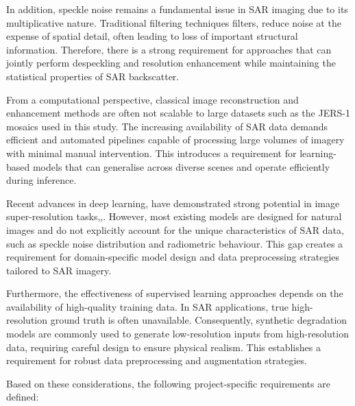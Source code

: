 \documentclass[conference]{IEEEtran}
\begin{document}
In addition, speckle noise remains a fundamental issue in SAR imaging due to its multiplicative nature. Traditional filtering techniques filters, reduce noise at the expense of spatial detail, often leading to loss of important structural information\cite{wei2025dynamical,electronics12132975}. Therefore, there is a strong requirement for approaches that can jointly perform despeckling and resolution enhancement while maintaining the statistical properties of SAR backscatter.

From a computational perspective, classical image reconstruction and enhancement methods are often not scalable to large datasets such as the JERS-1 mosaics used in this study. The increasing availability of SAR data demands efficient and automated pipelines capable of processing large volumes of imagery with minimal manual intervention\cite{zhu2017deep}. This introduces a requirement for learning-based models that can generalise across diverse scenes and operate efficiently during inference.

Recent advances in deep learning, have demonstrated strong potential in image super-resolution tasks\cite{Toosi2026S3ESRGAN},\cite{ye2024water},\cite{Song2022HAUnet}. However, most existing models are designed for natural images and do not explicitly account for the unique characteristics of SAR data, such as speckle noise distribution and radiometric behaviour. This gap creates a requirement for domain-specific model design and data preprocessing strategies tailored to SAR imagery\cite{Fracastoro2021Deep}.

Furthermore, the effectiveness of supervised learning approaches depends on the availability of high-quality training data. In SAR applications, true high-resolution ground truth is often unavailable. Consequently, synthetic degradation models are commonly used to generate low-resolution inputs from high-resolution data, requiring careful design to ensure physical realism\cite{electronics12132975}. This establishes a requirement for robust data preprocessing and augmentation strategies.

Based on these considerations, the following project-specific requirements are defined:
\end{document}
